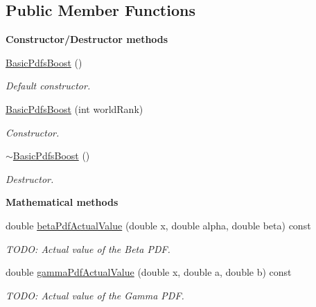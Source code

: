\subsection*{Public Member Functions}
\begin{Indent}{\bf Constructor/\-Destructor methods}\par
\begin{DoxyCompactItemize}
\item 
\hyperlink{class_q_u_e_s_o_1_1_basic_pdfs_boost_a7ba56f194cdce87c7ef247457a5ed4a6}{Basic\-Pdfs\-Boost} ()
\begin{DoxyCompactList}\small\item\em Default constructor. \end{DoxyCompactList}\item 
\hyperlink{class_q_u_e_s_o_1_1_basic_pdfs_boost_a6409e117dda8033c960db50f8293a385}{Basic\-Pdfs\-Boost} (int world\-Rank)
\begin{DoxyCompactList}\small\item\em Constructor. \end{DoxyCompactList}\item 
\hyperlink{class_q_u_e_s_o_1_1_basic_pdfs_boost_a0d1bc5ab5bdffb0870031746ebe37a94}{$\sim$\-Basic\-Pdfs\-Boost} ()
\begin{DoxyCompactList}\small\item\em Destructor. \end{DoxyCompactList}\end{DoxyCompactItemize}
\end{Indent}
\begin{Indent}{\bf Mathematical methods}\par
\begin{DoxyCompactItemize}
\item 
double \hyperlink{class_q_u_e_s_o_1_1_basic_pdfs_boost_a1fb018d87021cb4af85289102c7fddcb}{beta\-Pdf\-Actual\-Value} (double x, double alpha, double beta) const 
\begin{DoxyCompactList}\small\item\em T\-O\-D\-O\-: Actual value of the Beta P\-D\-F. \end{DoxyCompactList}\item 
double \hyperlink{class_q_u_e_s_o_1_1_basic_pdfs_boost_aabf856ea8be88e4fda2b378e91eee922}{gamma\-Pdf\-Actual\-Value} (double x, double a, double b) const 
\begin{DoxyCompactList}\small\item\em T\-O\-D\-O\-: Actual value of the Gamma P\-D\-F. \end{DoxyCompactList}\end{DoxyCompactItemize}
\end{Indent}
